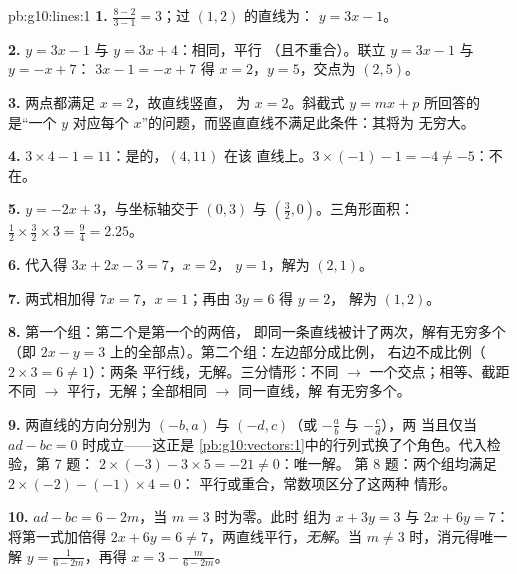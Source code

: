 \begin{solution}{pb:g10:lines:1}
\textbf{1.}  $\frac{8 - 2}{3 - 1} = 3$；过 $(1, 2)$ 的直线为：
$y = 3x - 1$。

\textbf{2.} $y = 3x - 1$ 与 $y = 3x + 4$：相同，平行
（且不重合）。联立 $y = 3x - 1$ 与 $y = -x + 7$：
$3x - 1 = -x + 7$ 得 $x = 2$，$y = 5$，交点为 $(2, 5)$。

\textbf{3.} 两点都满足 $x = 2$，故直线竖直，
为 $x = 2$。斜截式 $y = mx + p$ 所回答的是“一个 $y$
对应每个 $x$”的问题，而竖直直线不满足此条件：其将为
无穷大。

\textbf{4.} $3 \times 4 - 1 = 11$：是的，$(4, 11)$ 在该
直线上。$3 \times (-1) - 1 = -4 \neq -5$：不在。

\textbf{5.} $y = -2x + 3$，与坐标轴交于 $(0, 3)$ 与
$\left(\frac32, 0\right)$。三角形面积：
$\frac12 \times \frac32 \times 3 = \frac94 = 2.25$。

\textbf{6.} 代入得 $3x + 2x - 3 = 7$，$x = 2$，
$y = 1$，解为 $(2, 1)$。

\textbf{7.} 两式相加得 $7x = 7$，$x = 1$；再由 $3y = 6$ 得 $y = 2$，
解为 $(1, 2)$。

\textbf{8.} 第一个组：第二个是第一个的两倍，
即同一条直线被计了两次，解有无穷多个
（即 $2x - y = 3$ 上的全部点）。第二个组：左边部分成比例，
右边不成比例（$2 \times 3 = 6 \neq 1$）：两条
平行线，无解。三分情形：不同
$\to$ 一个交点；相等、截距不同 $\to$
平行，无解；全部相同 $\to$ 同一直线，解
有无穷多个。

\textbf{9.} 两直线的方向分别为 $(-b, a)$ 与
$(-d, c)$（或 $-\frac ab$ 与 $-\frac cd$），两
当且仅当 $ad - bc = 0$ 时成立——这正是
\cref{pb:g10:vectors:1}中的行列式换了个角色。代入检验，第 7 题：
$2 \times (-3) - 3 \times 5 = -21 \neq 0$：唯一解。
第 8 题：两个组均满足 $2 \times (-2) - (-1) \times 4 = 0$：
平行或重合，常数项区分了这两种
情形。

\textbf{10.} $ad - bc = 6 - 2m$，当 $m = 3$ 时为零。此时
组为 $x + 3y = 3$ 与 $2x + 6y = 7$：将第一式加倍得
$2x + 6y = 6 \neq 7$，两直线平行，\emph{无解}。当
$m \neq 3$ 时，消元得唯一解
$y = \frac{1}{6 - 2m}$，再得 $x = 3 - \frac{m}{6 - 2m}$。


\end{solution}
